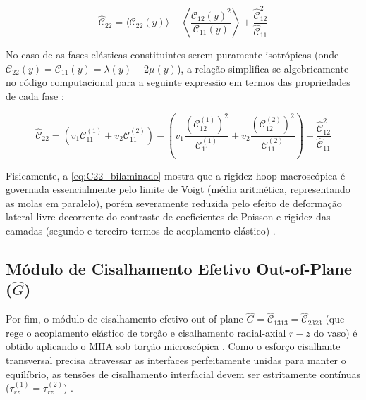 \begin{equation}
  \hat{\mathcal{C}}_{22} = \langle \mathcal{C}_{22}(y) \rangle - \left\langle \frac{\mathcal{C}_{12}(y)^2}{\mathcal{C}_{11}(y)} \right\rangle + \frac{\hat{\mathcal{C}}_{12}^2}{\hat{\mathcal{C}}_{11}}
  \label{eq:C22_eff_final}
\end{equation}


No caso de as fases elásticas constituintes serem puramente isotrópicas (onde $\mathcal{C}_{22}(y) = \mathcal{C}_{11}(y) = \lambda(y) + 2 \mu(y)$), a relação simplifica-se algebricamente no código computacional para a seguinte expressão em termos das propriedades de cada fase \cite{Sadd2009}:

\begin{equation}
  \hat{\mathcal{C}}_{22} = (v_1 \mathcal{C}_{11}^{(1)} + v_2 \mathcal{C}_{11}^{(2)}) - \left( v_1 \frac{(\mathcal{C}_{12}^{(1)})^2}{\mathcal{C}_{11}^{(1)}} + v_2 \frac{(\mathcal{C}_{12}^{(2)})^2}{\mathcal{C}_{11}^{(2)}} \right) + \frac{\hat{\mathcal{C}}_{12}^2}{\hat{\mathcal{C}}_{11}}
  \label{eq:C22_bilaminado}
\end{equation}

Fisicamente, a \eqref{eq:C22_bilaminado} mostra que a rigidez hoop macroscópica é governada essencialmente pelo limite de Voigt (média aritmética, representando as molas em paralelo), porém severamente reduzida pelo efeito de deformação lateral livre decorrente do contraste de coeficientes de Poisson e rigidez das camadas (segundo e terceiro termos de acoplamento elástico) \cite{Backus1962}.


\subsection{Módulo de Cisalhamento Efetivo Out-of-Plane ($\hat{G}$)}

Por fim, o módulo de cisalhamento efetivo out-of-plane $\hat{G} = \hat{\mathcal{C}}_{1313} = \hat{\mathcal{C}}_{2323}$ (que rege o acoplamento elástico de torção e cisalhamento radial-axial $r-z$ do vaso) é obtido aplicando o MHA sob torção microscópica \cite{bakhvalov1989}. Como o esforço cisalhante transversal precisa atravessar as interfaces perfeitamente unidas para manter o equilíbrio, as tensões de cisalhamento interfacial devem ser estritamente contínuas ($\tau_{rz}^{(1)} = \tau_{rz}^{(2)}$) \cite{bakhvalov1989}.

